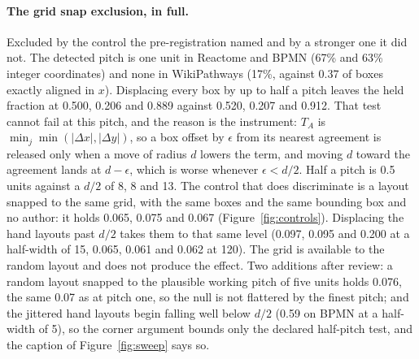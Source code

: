 \documentclass[a4paper,UKenglish]{gd-lipics-v3}
\begin{document}
\paragraph{The grid snap exclusion, in full.} Excluded by the
  control the pre-registration named and by a stronger one it did not. The detected pitch
  is one unit in Reactome and BPMN (67\% and 63\% integer coordinates) and none in
  WikiPathways (17\%, against 0.37 of boxes exactly aligned in $x$). Displacing every box
  by up to half a pitch leaves the held fraction at 0.500, 0.206 and 0.889 against 0.520,
  0.207 and 0.912. That test cannot fail at this pitch, and the reason is the instrument:
  $T_A$ is $\min_j\min(|\Delta x|,|\Delta y|)$, so a box offset by $\epsilon$ from its
  nearest agreement is released only when a move of radius $d$ lowers the term, and moving
  $d$ toward the agreement lands at $d-\epsilon$, which is worse whenever $\epsilon < d/2$.
  Half a pitch is 0.5 units against a $d/2$ of 8, 8 and 13. The control that does
  discriminate is a layout snapped to the same grid, with the same boxes and the same
  bounding box and no author: it holds 0.065, 0.075 and 0.067
  (Figure~\ref{fig:controls}). Displacing the hand layouts
  past $d/2$ takes them to that same level (0.097, 0.095 and 0.200 at a half-width of 15,
  0.065, 0.061 and 0.062 at 120). The grid is available to the random layout and does not
  produce the effect. Two additions after review: a random layout snapped to the
  plausible working pitch of five units holds 0.076, the same 0.07 as at pitch one, so
  the null is not flattered by the finest pitch; and the jittered hand layouts begin
  falling well below $d/2$ (0.59 on BPMN at a half-width of 5), so the corner argument
  bounds only the declared half-pitch test, and the caption of Figure~\ref{fig:sweep}
  says so.
\end{document}
